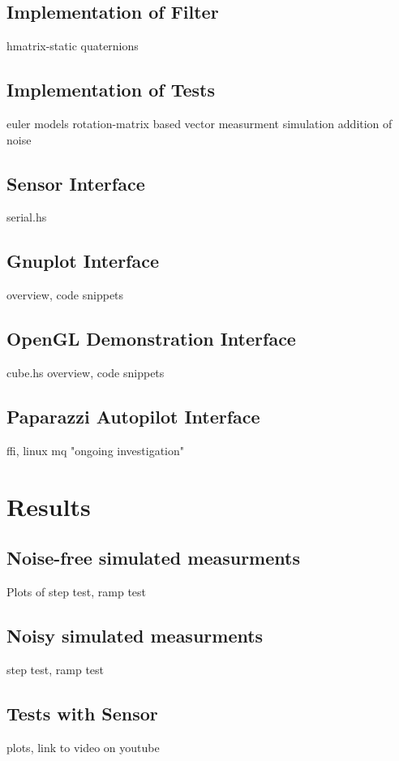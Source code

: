 \documentclass[12pt]{report}
\begin{document}
\subsection{Implementation of Filter}
hmatrix-static
quaternions
\subsection{Implementation of Tests}
euler models
rotation-matrix based vector measurment simulation
addition of noise
\subsection{Sensor Interface}
serial.hs
\subsection{Gnuplot Interface}
overview, code snippets
\subsection{OpenGL Demonstration Interface}
cube.hs overview, code snippets 
\subsection{Paparazzi Autopilot Interface}
ffi, linux mq
"ongoing investigation"

\section{Results}
\subsection{Noise-free simulated measurments}
Plots of step test, ramp test
\subsection{Noisy simulated measurments}
step test, ramp test
\subsection{Tests with Sensor}
plots, link to video on youtube
\end{document}
